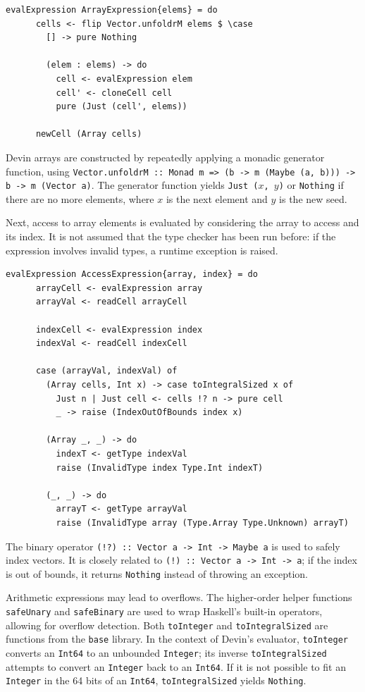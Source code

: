 \documentclass[UdineBachThesis,american,11pt]{PhdThesis}
\begin{document}
  \begin{Verbatim}[gobble=4,fontsize=\small]
    evalExpression ArrayExpression{elems} = do
      cells <- flip Vector.unfoldrM elems $ \case
        [] -> pure Nothing

        (elem : elems) -> do
          cell <- evalExpression elem
          cell' <- cloneCell cell
          pure (Just (cell', elems))

      newCell (Array cells)
  \end{Verbatim}

  Devin arrays are constructed by repeatedly applying a monadic generator
  function, using
  \mbox{\texttt{Vector.unfoldrM :: Monad m => (b -> m (Maybe (a, b))) -> b -> m (Vector a)}}.
  The generator function yields \mbox{\texttt{Just ($x$, $y$)}} or
  \mbox{\texttt{Nothing}} if there are no more elements, where $x$ is the next
  element and $y$ is the new seed.

  Next, access to array elements is evaluated by considering the array to access
  and its index. It is not assumed that the type checker has been run before: if
  the expression involves invalid types, a runtime exception is raised.

  \begin{Verbatim}[gobble=4,fontsize=\small]
    evalExpression AccessExpression{array, index} = do
      arrayCell <- evalExpression array
      arrayVal <- readCell arrayCell

      indexCell <- evalExpression index
      indexVal <- readCell indexCell

      case (arrayVal, indexVal) of
        (Array cells, Int x) -> case toIntegralSized x of
          Just n | Just cell <- cells !? n -> pure cell
          _ -> raise (IndexOutOfBounds index x)

        (Array _, _) -> do
          indexT <- getType indexVal
          raise (InvalidType index Type.Int indexT)

        (_, _) -> do
          arrayT <- getType arrayVal
          raise (InvalidType array (Type.Array Type.Unknown) arrayT)
  \end{Verbatim}

  The binary operator \mbox{\texttt{(!?) :: Vector a -> Int -> Maybe a}} is used
  to safely index vectors. It is closely related to
  \mbox{\texttt{(!) :: Vector a -> Int -> a}}; if the index is out of bounds, it
  returns \mbox{\texttt{Nothing}} instead of throwing an exception.

  Arithmetic expressions may lead to overflows. The higher-order helper
  functions \mbox{\texttt{safeUnary}} and \mbox{\texttt{safeBinary}} are used to
  wrap Haskell's built-in operators, allowing for overflow detection. Both
  \mbox{\texttt{toInteger}} and \mbox{\texttt{toIntegralSized}} are functions
  from the \mbox{\texttt{base}} library. In the context of Devin's evaluator,
  \mbox{\texttt{toInteger}} converts an \mbox{\texttt{Int64}} to an unbounded
  \mbox{\texttt{Integer}}; its inverse \mbox{\texttt{toIntegralSized}} attempts
  to convert an \mbox{\texttt{Integer}} back to an \mbox{\texttt{Int64}}. If it
  is not possible to fit an \mbox{\texttt{Integer}} in the 64 bits of an
  \mbox{\texttt{Int64}}, \mbox{\texttt{toIntegralSized}} yields
  \mbox{\texttt{Nothing}}.
\end{document}
